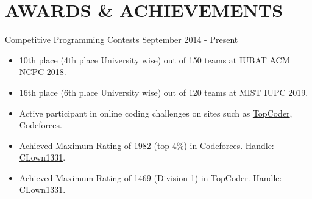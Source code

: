 \documentclass{resumestyle}
\begin{document}
\vspace{-4pt}

\section{AWARDS \& ACHIEVEMENTS}%

    \worksubsection%
        {Competitive Programming Contests}%
        {September 2014 - Present}%
        {}%
    
    \begin{itemize}[labelsep=4pt,leftmargin=*,topsep=5pt,partopsep=0pt,itemsep=1pt]%
        \item 10th place (4th place University wise) out of 150 teams at IUBAT ACM NCPC 2018.
        \item 16th place (6th place University wise) out of 120 teams at MIST IUPC 2019.
        \item Active participant in online coding challenges on sites such as {\href{https://www.topcoder.com/members/CLown1331/}{TopCoder}}, {\href{http://codeforces.com/profile/CLown1331}{Codeforces}}.
        \item Achieved Maximum Rating of 1982 (top 4\%) in Codeforces. Handle: {\href{http://codeforces.com/profile/CLown1331}{CLown1331}}. 
        \item Achieved Maximum Rating of 1469 (Division 1) in TopCoder. Handle: {\href{https://www.topcoder.com/members/CLown1331/}{CLown1331}}.
    \end{itemize}%
\end{document}

